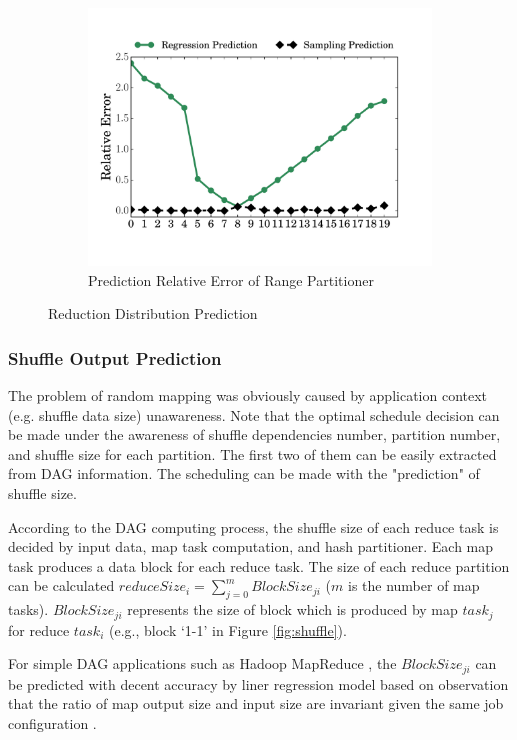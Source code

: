 \begin{figure}
\begin{subfigure}[b]{0.32\linewidth}
		\includegraphics[width=\linewidth]{fig/prediction_relative_error}
		\caption{Prediction Relative Error of Range Partitioner}
		\label{fig:prediction_relative_error}
	\end{subfigure}
	\caption{Reduction Distribution Prediction}
	\label{fig:dis}
\end{figure}

\subsubsection{Shuffle Output Prediction}\label{shuffleprediction}
The problem of random mapping was obviously caused by application context (e.g. shuffle data size) unawareness. Note that the optimal schedule decision can be made under the awareness of shuffle dependencies number, partition number, and shuffle size for each partition. The first two of them can be easily extracted from DAG information. The scheduling can be made with the "prediction" of shuffle size.

According to the DAG computing process, the shuffle size of each reduce task is decided by input data, map task computation, and hash partitioner. Each map task produces a data block for each reduce task. The size of each reduce partition can be calculated $reduceSize_i = \sum_{j=0}^{m} {BlockSize_{ji}}$ ($m$ is the number of map tasks). $BlockSize_{ji}$ represents the size of block which is produced by map $task_j$ for reduce $task_i$ (e.g., block `1-1' in Figure \ref{fig:shuffle}).

For simple DAG applications such as Hadoop MapReduce \cite{mapreduce}, the $BlockSize_{ji}$ can be predicted with decent accuracy by liner regression model based on observation that the ratio of map output size and input size are invariant given the same job configuration \cite{ishuffle, predict}.

